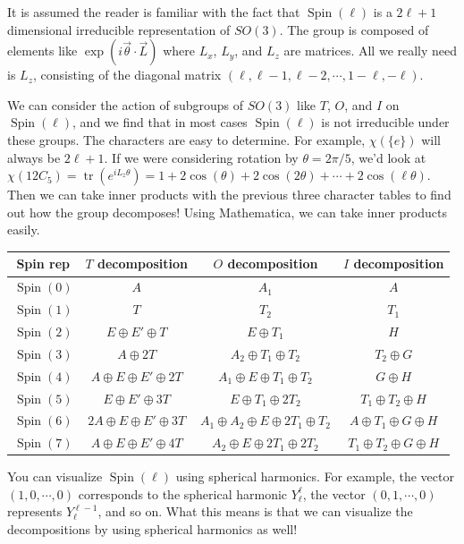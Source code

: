 \documentclass[12pt, letterpaper]{article}
\theoremstyle{definition} %
\def\tr{\operatorname{tr}}
\begin{document}
  It is assumed the reader is familiar with the fact that $\operatorname{Spin}(\ell)$ is a $2\ell+1$ dimensional irreducible
  representation of $SO(3)$. The group is composed of elements like $\exp( i\vec{\theta}\cdot\vec{L})$ where $L_x$, $L_y$, and $L_z$ 
  are matrices. All we really need is $L_z$, consisting of the diagonal matrix $(\ell,\ell-1,\ell-2,\cdots,1-\ell,-\ell)$. 

  We can consider the action of subgroups of $SO(3)$ like $T$, $O$, and $I$ on $\operatorname{Spin}(\ell)$, and we find that 
  in most cases $\operatorname{Spin}(\ell)$ is not irreducible under these groups. The characters are easy to determine. For example,
  $\chi(\{e\})$ will always be $2\ell+1$. If we were considering rotation by $\theta=2\pi/5$, we'd look at 
  $\chi(12 C_5)=\tr(e^{i L_z \theta})=1+2\cos(\theta)+2\cos(2\theta)+\cdots+2\cos(\ell\theta)$. Then we can take inner products with
  the previous three character tables to find out how the group decomposes!
  Using Mathematica, we can take inner products easily.

\begin{center}
  \begin{tabular}{|c | c | c| c |}
    \hline
  Spin rep& $T$ decomposition & $O$ decomposition & $I$ decomposition \\
    \hline
    $\operatorname{Spin}(0)$ & $A$ & $A_1$ & $A$ \\
 $\operatorname{Spin}(1)$ & $T$ & $T_2$ & $T_1$ \\
 $\operatorname{Spin}(2)$ & $E\oplus E'\oplus T$ & $E\oplus T_1$ & $H$ \\
 $\operatorname{Spin}(3)$ & $A\oplus 2T$ & $A_2\oplus T_1\oplus T_2$ & $T_2\oplus G$ \\
 $\operatorname{Spin}(4)$ & $A\oplus E\oplus E'\oplus 2T$ & $A_1\oplus E\oplus T_1\oplus T_2$ & $G\oplus H$ \\
 $\operatorname{Spin}(5)$ & $E\oplus E'\oplus 3T$ & $E\oplus T_1\oplus 2T_2$ & $T_1\oplus T_2\oplus H$ \\
 $\operatorname{Spin}(6)$ & $2A\oplus E\oplus E'\oplus 3T$ & $A_1\oplus A_2\oplus E\oplus 2T_1\oplus T_2$ & $A\oplus T_1\oplus G\oplus H$ \\
 $\operatorname{Spin}(7)$ & $A\oplus E\oplus E'\oplus 4T$ & $A_2\oplus E\oplus 2T_1\oplus 2T_2$ & $T_1\oplus T_2\oplus G\oplus H$\\
 \hline
\end{tabular}
\end{center}

You can visualize $\operatorname{Spin}(\ell)$ using spherical harmonics. For example, the vector $(1,0,\cdots,0)$ corresponds to the
spherical harmonic $Y_\ell^\ell$, the vector $(0,1,\cdots,0)$ represents $Y_\ell^{\ell-1}$, and so on. What this means is that we can
visualize the decompositions by using spherical harmonics as well!  
\end{document}
